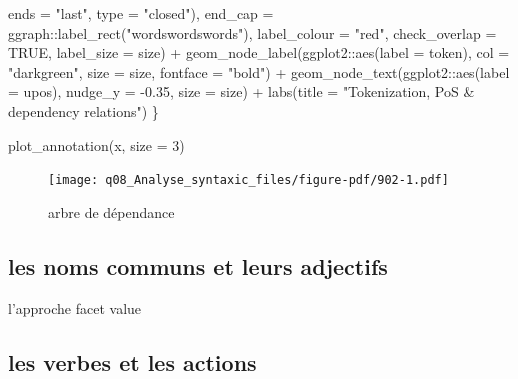 \documentclass[
  letterpaper,
  DIV=11,
  numbers=noendperiod]{scrreprt}
\newenvironment{Shaded}{\begin{snugshade}}{\end{snugshade}}
\newcommand{\AttributeTok}[1]{\textcolor[rgb]{0.40,0.45,0.13}{#1}}
\newcommand{\ConstantTok}[1]{\textcolor[rgb]{0.56,0.35,0.01}{#1}}
\newcommand{\DecValTok}[1]{\textcolor[rgb]{0.68,0.00,0.00}{#1}}
\newcommand{\FloatTok}[1]{\textcolor[rgb]{0.68,0.00,0.00}{#1}}
\newcommand{\FunctionTok}[1]{\textcolor[rgb]{0.28,0.35,0.67}{#1}}
\newcommand{\NormalTok}[1]{\textcolor[rgb]{0.00,0.23,0.31}{#1}}
\newcommand{\SpecialCharTok}[1]{\textcolor[rgb]{0.37,0.37,0.37}{#1}}
\newcommand{\StringTok}[1]{\textcolor[rgb]{0.13,0.47,0.30}{#1}}
\begin{document}
\begin{Shaded}
\begin{Highlighting}[]
                                      \AttributeTok{ends =} \StringTok{"last"}\NormalTok{, }\AttributeTok{type =} \StringTok{"closed"}\NormalTok{),}
                  \AttributeTok{end\_cap =}\NormalTok{ ggraph}\SpecialCharTok{::}\FunctionTok{label\_rect}\NormalTok{(}\StringTok{"wordswordswords"}\NormalTok{),}
                  \AttributeTok{label\_colour =} \StringTok{"red"}\NormalTok{, }\AttributeTok{check\_overlap =} \ConstantTok{TRUE}\NormalTok{, }\AttributeTok{label\_size =}\NormalTok{ size) }\SpecialCharTok{+}
    \FunctionTok{geom\_node\_label}\NormalTok{(ggplot2}\SpecialCharTok{::}\FunctionTok{aes}\NormalTok{(}\AttributeTok{label =}\NormalTok{ token), }\AttributeTok{col =} \StringTok{"darkgreen"}\NormalTok{, }
                    \AttributeTok{size =}\NormalTok{ size, }\AttributeTok{fontface =} \StringTok{"bold"}\NormalTok{) }\SpecialCharTok{+}
    \FunctionTok{geom\_node\_text}\NormalTok{(ggplot2}\SpecialCharTok{::}\FunctionTok{aes}\NormalTok{(}\AttributeTok{label =}\NormalTok{ upos), }\AttributeTok{nudge\_y =} \SpecialCharTok{{-}}\FloatTok{0.35}\NormalTok{, }\AttributeTok{size =}\NormalTok{ size)  }\SpecialCharTok{+}
    \FunctionTok{labs}\NormalTok{(}\AttributeTok{title =} \StringTok{"Tokenization, PoS \& dependency relations"}\NormalTok{)}
\NormalTok{\}}

\FunctionTok{plot\_annotation}\NormalTok{(x, }\AttributeTok{size =} \DecValTok{3}\NormalTok{)}
\end{Highlighting}
\end{Shaded}

\begin{figure}[H]

{\centering \texttt{[image: q08\_Analyse\_syntaxic\_files/figure-pdf/902-1.pdf]}

}

\caption{arbre de dépendance}

\end{figure}%

\subsection{les noms communs et leurs
adjectifs}\label{les-noms-communs-et-leurs-adjectifs}

l'approche facet value

\subsection{les verbes et les actions}\label{les-verbes-et-les-actions}
\end{document}
